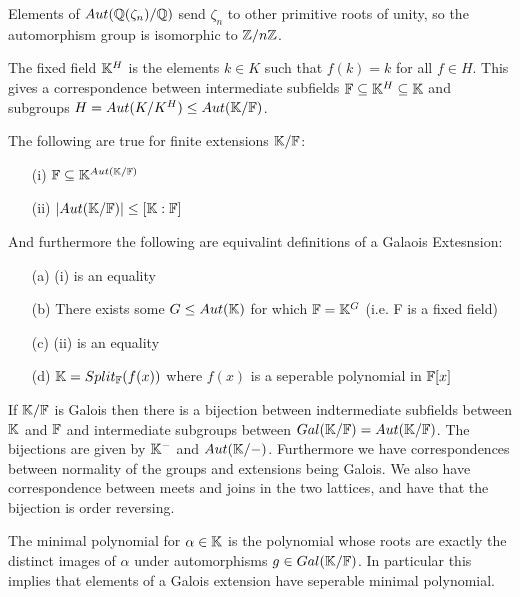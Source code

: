 \documentclass[11pt]{article}
\begin{document}
\begin{example}
  Elements of $Aut(\mathbb{Q}(\zeta_n)/\mathbb{Q})$ send $\zeta_n$ to other primitive roots of unity, so the automorphism group is isomorphic to $\mathbb{Z}/n\mathbb{Z}$.
\end{example}

\begin{definition}
  The fixed field $\mathbb{K}^H$ is the elements $k \in K$ such that $f(k) = k$ for all $f \in H$. This gives a correspondence between intermediate subfields $\mathbb{F} \subseteq \mathbb{K}^H \subseteq \mathbb{K}$ and subgroups $H = Aut(K/K^H) \le Aut(\mathbb{K}/\mathbb{F})$.
\end{definition}
\begin{theorem}
  The following are true for finite extensions $\mathbb{K}/\mathbb{F}$:
  \begin{itemize}
  \item[(i)] $\mathbb{F} \subseteq \mathbb{K}^{Aut(\mathbb{K}/\mathbb{F})}$
  \item[(ii)] $|Aut(\mathbb{K}/\mathbb{F})| \le [\mathbb{K} : \mathbb{F}]$
  \end{itemize}
  And furthermore the following are equivalint definitions of a Galaois Extesnsion:
  \begin{itemize}
  \item[(a)] (i) is an equality
  \item[(b)] There exists some $G \le Aut(\mathbb{K})$ for which $\mathbb{F} = \mathbb{K}^G$ (i.e. F is a fixed field)
  \item[(c)] (ii) is an equality
  \item[(d)] $\mathbb{K} = Split_{\mathbb{F}}(f(x))$ where $f(x)$ is a seperable polynomial in $\mathbb{F}[x]$
  \end{itemize}
\end{theorem}

\begin{theorem}
  If $\mathbb{K}/\mathbb{F}$ is Galois then there is a bijection between indtermediate subfields between $\mathbb{K}$ and $\mathbb{F}$ and intermediate subgroups between $Gal(\mathbb{K}/\mathbb{F}) = Aut(\mathbb{K}/\mathbb{F})$. The bijections are given by $\mathbb{K}^-$ and $Aut(\mathbb{K}/-)$. Furthermore we have correspondences between normality of the groups and extensions being Galois. We also have correspondence between meets and joins in the two lattices, and have that the bijection is order reversing.
\end{theorem}

\begin{remark}
  The minimal polynomial for $\alpha \in \mathbb{K}$ is the polynomial whose roots are exactly the distinct images of $\alpha$ under automorphisms $g \in Gal(\mathbb{K}/\mathbb{F})$. In particular this implies that elements of a Galois extension have seperable minimal polynomial.
\end{remark}
\end{document}
